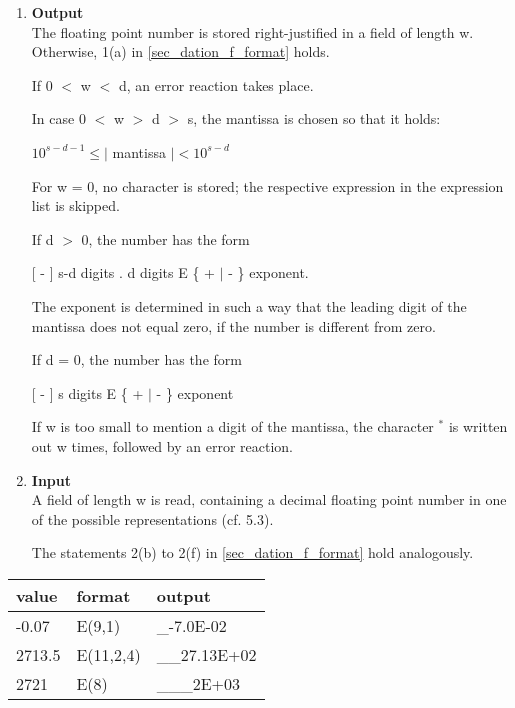 \begin{removed}
\begin{enumerate}
\item {\bf Output}\\
The floating point number is stored right-justified in a field of length
w. Otherwise, 1(a) in \ref{sec_dation_f_format} holds.

If 0 $<$ w $<$ d, an error reaction takes place.

In case 0 $<$ w $>$ d $>$ s, the mantissa is chosen so that it holds:

\hspace*{1cm}$10^{s-d-1} \leq \mid$ mantissa $\mid < 10^{s-d}$

For w = 0, no character is stored; the respective expression in the
expression list is skipped.

If d $>$ 0, the number has the form

\hspace*{1cm}[ - ] s-d digits . d digits E \{ + $\mid$ - \} exponent.

The exponent is determined in such a way that the leading digit of the
mantissa does not equal zero, if the number is different from zero.

If d = 0, the number has the form

\hspace*{1cm}[ - ] s digits E \{ + $\mid$ - \} exponent

If w is too small to mention a digit of the mantissa, the character $^*$
is written out w times, followed by an error reaction.
\item {\bf Input}\\
A field of length w is read, containing a decimal floating point number
in one of the possible representations (cf. 5.3).

The statements 2(b) to 2(f) in \ref{sec_dation_f_format} hold analogously.
\end{enumerate}

\begin{tabular}{lll}
value  & format    & output \\ \hline
-0.07  & E(9,1)    & \_-7.0E-02 \\
2713.5 & E(11,2,4) & \_\_27.13E+02 \\
2721   & E(8)      & \_\_\_2E+03
\end{tabular}
\end{removed}

